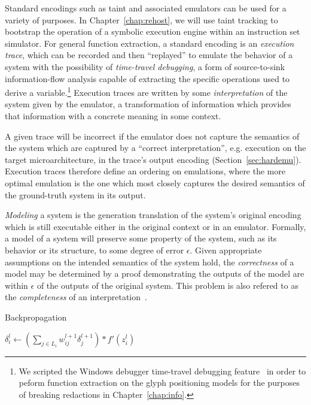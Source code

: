 Standard encodings such as taint and associated emulators can be used for a variety of purposes.
In Chapter~\ref{chap:rehost}, we will use taint tracking to bootstrap the operation of a symbolic execution engine within an instruction set simulator.
For general function extraction, a standard encoding is an \emph{execution trace}, which can be recorded and then ``replayed'' to emulate the behavior of a system with the possibility of \emph{time-travel debugging}, a form of source-to-sink information-flow analysis capable of extracting the specific operations used to derive a variable.\footnote{
	We scripted the Windows debugger time-travel debugging feature~\cite{timetravel} in order to peform function extraction on the glyph positioning models for the purposes of breaking redactions in Chapter~\ref{chap:info}.}
Execution traces are written by some \emph{interpretation} of the system given by the emulator, a transformation of information which provides that information with a concrete meaning in some context.

A given trace will be incorrect if the emulator does not capture the semantics of the system which are captured by a ``correct interpretation'', e.g. execution on the target microarchitecture, in the trace's output encoding (Section~\ref{sec:hardemu}).
Execution traces therefore define an ordering on emulations, where the more optimal emulation is the one which most closely captures the desired semantics of the ground-truth system in its output.

\emph{Modeling} a system is the generation translation of the system's original encoding which is still executable either in the original context or in an emulator.
Formally, a model of a system will preserve some property of the system, such as its behavior or its structure, to some degree of error $\epsilon$.
Given appropriate assumptions on the intended semantics of the system hold, the \emph{correctness} of a model may be determined by a proof demonstrating the outputs of the model are within $\epsilon$ of the outputs of the original system.
This problem is also refered to as the \emph{completeness} of an interpretation~\cite{campion2022partial}.

\begin{algorithm}
\caption{Backpropagation}
\label{alg:backprop}
\begin{algorithmic}[1]
		\State $\delta_{i}^{l} \gets (\sum_{j \in L_{i}} w_{ij}^{l+1} \delta_{j}^{l+1}) * f'(z_{i}^{l})$
	\EndFor
\EndFor
\EndProcedure
\end{algorithmic}
\end{algorithm}

